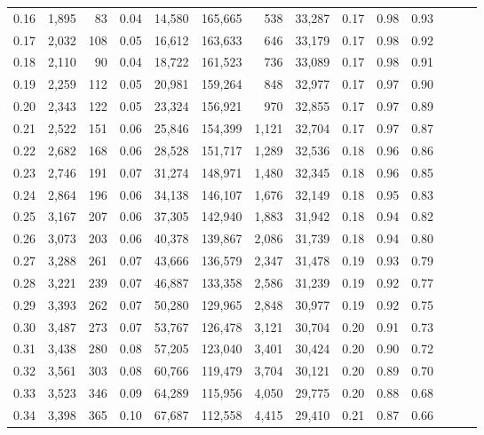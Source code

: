 \begin{tabular}{rrrrrrrrrrrrrr}
0.16 &  1,895 &   83 &  0.04 &   14,580 &  165,665 &     538 &  33,287 &  0.17 &  0.98 &      0.93 \\
0.17 &  2,032 &  108 &  0.05 &   16,612 &  163,633 &     646 &  33,179 &  0.17 &  0.98 &      0.92 \\
0.18 &  2,110 &   90 &  0.04 &   18,722 &  161,523 &     736 &  33,089 &  0.17 &  0.98 &      0.91 \\
0.19 &  2,259 &  112 &  0.05 &   20,981 &  159,264 &     848 &  32,977 &  0.17 &  0.97 &      0.90 \\
0.20 &  2,343 &  122 &  0.05 &   23,324 &  156,921 &     970 &  32,855 &  0.17 &  0.97 &      0.89 \\
0.21 &  2,522 &  151 &  0.06 &   25,846 &  154,399 &   1,121 &  32,704 &  0.17 &  0.97 &      0.87 \\
0.22 &  2,682 &  168 &  0.06 &   28,528 &  151,717 &   1,289 &  32,536 &  0.18 &  0.96 &      0.86 \\
0.23 &  2,746 &  191 &  0.07 &   31,274 &  148,971 &   1,480 &  32,345 &  0.18 &  0.96 &      0.85 \\
0.24 &  2,864 &  196 &  0.06 &   34,138 &  146,107 &   1,676 &  32,149 &  0.18 &  0.95 &      0.83 \\
0.25 &  3,167 &  207 &  0.06 &   37,305 &  142,940 &   1,883 &  31,942 &  0.18 &  0.94 &      0.82 \\
0.26 &  3,073 &  203 &  0.06 &   40,378 &  139,867 &   2,086 &  31,739 &  0.18 &  0.94 &      0.80 \\
0.27 &  3,288 &  261 &  0.07 &   43,666 &  136,579 &   2,347 &  31,478 &  0.19 &  0.93 &      0.79 \\
0.28 &  3,221 &  239 &  0.07 &   46,887 &  133,358 &   2,586 &  31,239 &  0.19 &  0.92 &      0.77 \\
0.29 &  3,393 &  262 &  0.07 &   50,280 &  129,965 &   2,848 &  30,977 &  0.19 &  0.92 &      0.75 \\
0.30 &  3,487 &  273 &  0.07 &   53,767 &  126,478 &   3,121 &  30,704 &  0.20 &  0.91 &      0.73 \\
0.31 &  3,438 &  280 &  0.08 &   57,205 &  123,040 &   3,401 &  30,424 &  0.20 &  0.90 &      0.72 \\
0.32 &  3,561 &  303 &  0.08 &   60,766 &  119,479 &   3,704 &  30,121 &  0.20 &  0.89 &      0.70 \\
0.33 &  3,523 &  346 &  0.09 &   64,289 &  115,956 &   4,050 &  29,775 &  0.20 &  0.88 &      0.68 \\
0.34 &  3,398 &  365 &  0.10 &   67,687 &  112,558 &   4,415 &  29,410 &  0.21 &  0.87 &      0.66 \\

\end{tabular}
